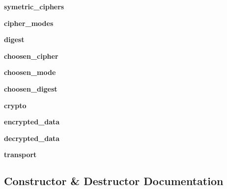 \begin{DoxyCompactItemize}
{\bfseries symetric\+\_\+ciphers}
\item 
\mbox{\label{classserver_1_1ClientHandler_a7d6463515504e2d506170c5bd23150b0}} 
{\bfseries cipher\+\_\+modes}
\item 
\mbox{\label{classserver_1_1ClientHandler_a10edb3ff76fa53c61fc65da6280f39c2}} 
{\bfseries digest}
\item 
\mbox{\label{classserver_1_1ClientHandler_aebd5f1ca1594374fbb228522e940f32b}} 
{\bfseries choosen\+\_\+cipher}
\item 
\mbox{\label{classserver_1_1ClientHandler_a9fd66405413e6c2ba3772b0cb97122ef}} 
{\bfseries choosen\+\_\+mode}
\item 
\mbox{\label{classserver_1_1ClientHandler_a669ae10ad3edac843045e7c03e920e0d}} 
{\bfseries choosen\+\_\+digest}
\item 
\mbox{\label{classserver_1_1ClientHandler_ac65459784c389ed42a3057481e707bc5}} 
{\bfseries crypto}
\item 
\mbox{\label{classserver_1_1ClientHandler_abed016c17504fc0c794002ea68e37745}} 
{\bfseries encrypted\+\_\+data}
\item 
\mbox{\label{classserver_1_1ClientHandler_a39c0f8fb598b0911b672f37c52453689}} 
{\bfseries decrypted\+\_\+data}
\item 
\mbox{\label{classserver_1_1ClientHandler_aeb8cdebb39c3ad077bc29aebda15ddd8}} 
{\bfseries transport}
\end{DoxyCompactItemize}


\subsection{Constructor \& Destructor Documentation}
\mbox{\label{classserver_1_1ClientHandler_ac2ecc8db8969205430e7a85823eb8fd2}} 
